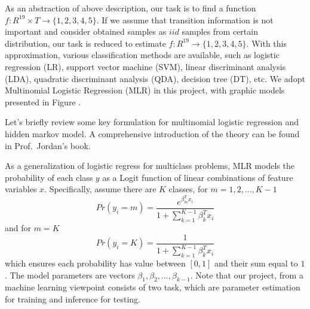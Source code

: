 As an abstraction of above description, our task is to find a function $f: R^{19}\times T \rightarrow \{1,2,3,4,5\}$. If we assume that transition information is not important and consider obtained samples as $iid$ samples from certain distribution, our task is reduced to estimate $f: R^{19} \rightarrow \{1,2,3,4,5\}$. With this approximation, various classification methods are available, such as logistic regression (LR), support vector machine (SVM), linear discriminant analysis (LDA),  quadratic discriminant analysis (QDA), decision tree (DT), etc. We adopt Multinomial Logistic Regression (MLR) in this project, with graphic models presented in Figure . %


Let's briefly review some key formulation for multinomial logistic regression and hidden markov model. A comprehensive introduction of the theory can be found in Prof.~Jordan's book.

As a generalization of logistic regress for multiclass problems, MLR models the probability of each class $y$ as a Logit function of linear combinations of feature variables $x$. Specifically, assume there are $K$ classes, for $m=1,2,...,K-1$
\begin{equation}
Pr(y_i=m) = \frac{e^{\beta_m^Tx_i}}{1+\sum_{k=1}^{K-1}\beta_k^Tx_i}
\end{equation}
and for $m=K$
\begin{equation}
Pr(y_i=K) = \frac{1}{1+\sum_{k=1}^{K-1}\beta_k^Tx_i}
\end{equation}
which ensures each probability has value between $[0,1]$ and their sum equal to $1$. The model parameters are vectors $\beta_1,\beta_2,...,\beta_{k-1}$. Note that our project, from a machine learning viewpoint consists of two task, which are parameter estimation for training and inference for testing. 


